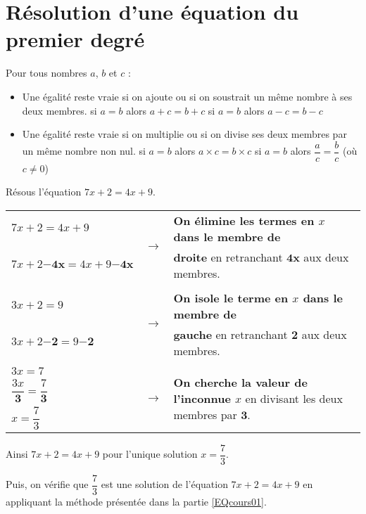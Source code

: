 \newpage

\section{Résolution d'une équation du premier degré}\label{EQcours02}
 

\begin{propriete}
Pour tous nombres $a$, $b$ et $c$ :
\begin{itemize}
    \item Une égalité reste vraie si on ajoute ou si on soustrait un même nombre à ses deux membres.
        \subitem si $a = b$ alors $a + c = b + c$
        \subitem si $a = b$ alors $a -c = b -c$
    \item Une égalité reste vraie si on multiplie ou si on divise ses deux membres par un même nombre non nul.
        \subitem si $a = b$ alors $a  \times c = b  \times c$
        \subitem si $a = b$ alors $\dfrac{a}{c}=\dfrac{b}{c}$ (où $c \neq 0$)
\end{itemize}
\end{propriete}








\begin{exemple*1}

Résous l'équation $7x + 2 = 4x + 9$.

\correction

\vspace{.5em}

\begin{tabular}{lcl}
$7x + 2 = 4x + 9$ & \multirow{2}{*}{$\longrightarrow$} & \textbf{On élimine les termes en $x$ dans le membre de} \\
$7x + 2 \boldsymbol{-4x} = 4x + 9 \boldsymbol{-4x}$ &  & \textbf{droite} en retranchant $\boldsymbol{4x}$ aux deux membres.\\
& & \\
%
$3x + 2 = 9$ & \multirow{2}{*}{$\longrightarrow$} & \textbf{On isole le terme en $x$ dans le membre de}\\
$3x + 2 \boldsymbol{-2} = 9 \boldsymbol{-2}$ & & \textbf{gauche} en retranchant $\boldsymbol{2}$ aux deux membres.\\
& & \\
%
$3x = 7$ & \multirow{3}{*}{$\longrightarrow$} & \multirow{3}{*}{\textbf{On cherche la valeur de l'inconnue $x$} en divisant les deux membres par $\boldsymbol{3}$.}\\
$\dfrac{3x}{\boldsymbol{3}}=\dfrac{7}{\boldsymbol{3}}$ &  & \\
$x=\dfrac{7}{3}$ &  & \\
%
\end{tabular}

\vspace{1em}

Ainsi $7x + 2 = 4x + 9$ pour l'unique solution $x=\dfrac{7}{3}$. 

Puis, on vérifie que $\dfrac{7}{3}$ est une solution de l'équation $7x + 2 = 4x + 9$ en appliquant la méthode présentée dans la partie \ref{EQcours01}.
\end{exemple*1}


